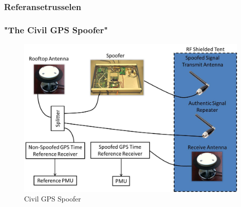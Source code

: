 \documentclass[xcolor=table]{beamer}
\begin{document}
\subsubsection{Referansetrusselen}
\begin{frame}
  \frametitle{"The Civil GPS Spoofer"}
  \begin{figure}
    \includegraphics[scale=0.2]{thesis/graphics/spoof.jpg}
    \caption{Civil GPS Spoofer \cite{EVPMUGA}}
  \end{figure}
\end{frame}

\end{document}
